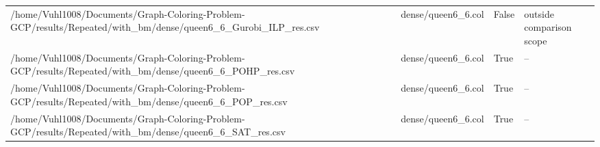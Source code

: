\begin{table}[htbp]
\begin{tabular}{llll}
/home/Vuhl1008/Documents/Graph-Coloring-Problem-GCP/results/Repeated/with\_bm/dense/queen6\_6\_Gurobi\_ILP\_res.csv & dense/queen6\_6.col & False & outside comparison scope \\
/home/Vuhl1008/Documents/Graph-Coloring-Problem-GCP/results/Repeated/with\_bm/dense/queen6\_6\_POHP\_res.csv & dense/queen6\_6.col & True & -- \\
/home/Vuhl1008/Documents/Graph-Coloring-Problem-GCP/results/Repeated/with\_bm/dense/queen6\_6\_POP\_res.csv & dense/queen6\_6.col & True & -- \\
/home/Vuhl1008/Documents/Graph-Coloring-Problem-GCP/results/Repeated/with\_bm/dense/queen6\_6\_SAT\_res.csv & dense/queen6\_6.col & True & -- \\
\hline
\end{tabular}
\end{table}
